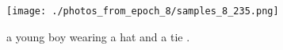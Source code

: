 \documentclass{article}%
\begin{document}
%


\begin{figure}[h!]%
\centering%
\texttt{[image: ./photos\_from\_epoch\_8/samples\_8\_235.png]}%
\caption{a young boy wearing a hat and a tie .}%
\end{figure}

%
\end{document}
